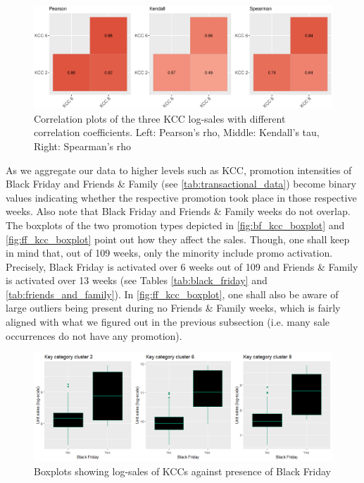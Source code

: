 \begin{figure}[H]
\centering
  \includegraphics[width=0.95\linewidth]{figures/corplot_kcc.eps}
  \caption{Correlation plots of the three \ac{KCC} log-sales with different correlation coefficients. Left: Pearson's rho, Middle: Kendall's tau, Right: Spearman's rho}
  \label{fig:corplot_kcc}
\end{figure}



 
As we aggregate our data to higher levels such as \ac{KCC}, promotion intensities of Black Friday and Friends \& Family (see \autoref{tab:transactional_data}) become binary values indicating whether the respective promotion took place in those respective weeks. Also note that Black Friday and Friends \& Family weeks do not overlap. The boxplots of the two promotion types depicted in \autoref{fig:bf_kcc_boxplot} and \autoref{fig:ff_kcc_boxplot} point out how they affect the sales. Though, one shall keep in mind that, out of 109 weeks, only the minority include promo activation. Precisely, Black Friday is activated over 6 weeks out of 109 and Friends \& Family is activated over 13 weeks
(see Tables \ref{tab:black_friday} and \ref{tab:friends_and_family}). In \autoref{fig:ff_kcc_boxplot}, one shall also be aware of large outliers being present during no Friends \& Family weeks, which is fairly aligned with what we figured out in the previous subsection (i.e. many sale occurrences do not have any promotion).
\\


\begin{figure}[H]
\centering
  \includegraphics[width=0.95\linewidth]{figures/bf_kcc_boxplot.png}
  \caption{Boxplots showing log-sales of KCCs against presence of Black Friday}
  \label{fig:bf_kcc_boxplot}
\end{figure}


